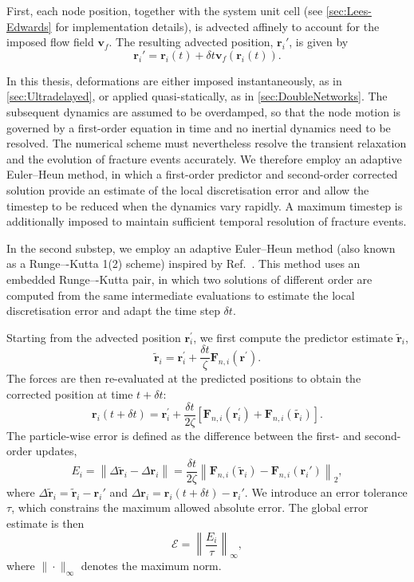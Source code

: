 First, each node position, together with the system unit cell (see \cref{sec:Lees-Edwards} for implementation details), is advected affinely to account for the imposed flow field $\bm{v}_f$. The resulting advected position, $\bm{r}_i'$, is given by
\begin{equation*}
    \bm{r}_i' = \bm{r}_i(t) + \delta t \bm{v}_f(\bm{r}_i(t)).
\end{equation*}

In this thesis, deformations are either imposed instantaneously, as in \cref{sec:Ultradelayed}, or applied quasi-statically, as in \cref{sec:DoubleNetworks}. The subsequent dynamics are assumed to be overdamped, so that the node motion is governed by a first-order equation in time and no inertial dynamics need to be resolved. The numerical scheme must nevertheless resolve the transient relaxation and the evolution of fracture events accurately. We therefore employ an adaptive Euler--Heun method, in which a first-order predictor and second-order corrected solution provide an estimate of the local discretisation error and allow the timestep to be reduced when the dynamics vary rapidly. A maximum timestep is additionally imposed to maintain sufficient temporal resolution of fracture events.

In the second substep, we employ an adaptive Euler--Heun method (also known as a Runge–-Kutta 1(2) scheme) inspired by Ref.~\cite{sammullerAdaptiveBrownianDynamics2021}. This method uses an embedded Runge–-Kutta pair, in which two solutions of different order are computed from the same intermediate evaluations to estimate the local discretisation error and adapt the time step $\delta t$. 

Starting from the advected position $\bm{r}^\prime_i$, we first compute the predictor estimate $\tilde{\bm{r}}_i$,
\begin{equation*}
    \tilde{\bm{r}}_i = \bm{r}^\prime_i + \frac{\delta t}{\zeta} \bm{F}_{n,i}(\bm{r}^\prime).
\end{equation*}
The forces are then re-evaluated at the predicted positions to obtain the corrected position at time $t+\delta t$:
\begin{equation*}
    \bm{r}_i(t + \delta t) = \bm{r}^\prime_i + \frac{\delta t}{2\zeta} \left[ \bm{F}_{n,i}( \bm{r}^\prime_i ) + \bm{F}_{n,i}(\tilde{\bm{r}_i}) \right].
\end{equation*}
The particle-wise error is defined as the difference between the first- and second-order updates,
\begin{equation*}
    E_i = \left\| \Delta\tilde{\bm{r}}_i - \Delta\bm{r}_i \right\| 
    = \frac{\delta t}{2\zeta}\left\| \bm{F}_{n,i}(\tilde{\bm{r}}_i) - \bm{F}_{n,i}(\bm{r}_i') \right\|_2,
\end{equation*}
where $\Delta\tilde{\bm{r}}_i = \tilde{\bm{r}}_i - \bm{r}_i'$ and $\Delta\bm{r}_i = \bm{r}_i(t+\delta t) - \bm{r}_i'$. We introduce an error tolerance $\tau$, which constrains the maximum allowed absolute error. The global error estimate is then
\begin{equation*}
    \mathcal{E} = \left\| \frac{E_i}{\tau} \right\|_\infty,
\end{equation*}
where $\|\cdot\|_\infty$ denotes the maximum norm.

